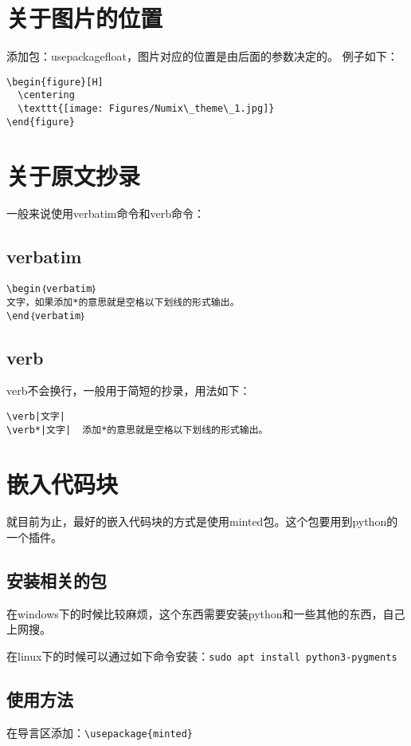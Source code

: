 \documentclass[a4paper,12pt]{ctexart}
\begin{document}
\section{关于图片的位置}
添加包：usepackage{float}，图片对应的位置是由后面的参数决定的。
例子如下：
\begin{verbatim}
\begin{figure}[H]
  \centering
  \texttt{[image: Figures/Numix\_theme\_1.jpg]}
\end{figure}
\end{verbatim}




\section{关于原文抄录}
一般来说使用verbatim命令和verb命令：
\subsection{verbatim}
\begin{verbatim}
\begin｛verbatim｝
文字，如果添加*的意思就是空格以下划线的形式输出。
\end｛verbatim｝
\end{verbatim}
\subsection{verb}
verb不会换行，一般用于简短的抄录，用法如下：
\begin{verbatim}
\verb|文字|
\verb*|文字|  添加*的意思就是空格以下划线的形式输出。
\end{verbatim}



\section{嵌入代码块}
就目前为止，最好的嵌入代码块的方式是使用minted包。这个包要用到python的一个插件。
\subsection{安装相关的包}
在windows下的时候比较麻烦，这个东西需要安装python和一些其他的东西，自己上网搜。

在linux下的时候可以通过如下命令安装：\verb|sudo apt install python3-pygments|

\subsection{使用方法}
在导言区添加：\verb|\usepackage{minted}|
\end{document}
